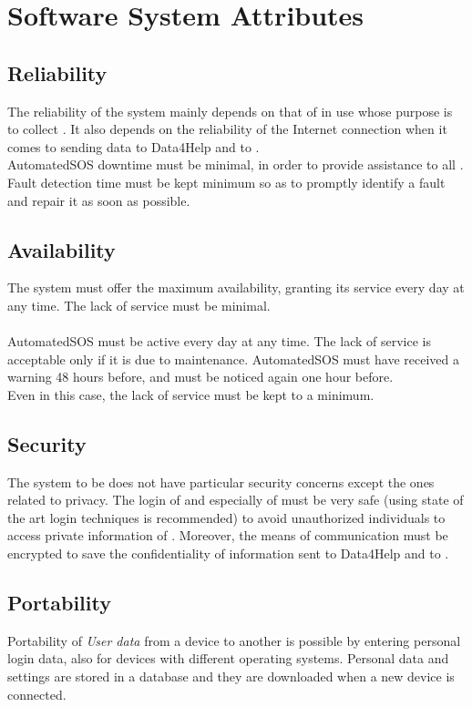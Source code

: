 \documentclass[../../rasd.tex]{subfiles}
\begin{document}
\section{Software System Attributes}
			
			\subsection{Reliability\label{sect:3.5.1}}
			The reliability of the system mainly depends on that of  in use whose purpose is to collect . It also depends on the reliability of the Internet connection when it comes to sending data to Data4Help and to .\\
			AutomatedSOS downtime must be minimal, in order to provide assistance to all . Fault detection time must be kept minimum so as to promptly identify a fault and repair it as soon as possible.

			\subsection{Availability}
			The system must offer the maximum availability, granting its service every day at any time. The lack of service must be minimal.\\\\
			AutomatedSOS must be active every day at any time. The lack of service is acceptable only if it is due to maintenance. AutomatedSOS  must have received a warning 48 hours before, and must be noticed again one hour before. \\
			Even in this case, the lack of service must be kept to a minimum.

			\subsection{Security}
			The system to be does not have particular security concerns except the ones related to privacy. The login of  and especially of  must be very safe (using state of the art login techniques is recommended) to avoid unauthorized individuals to access private information of . Moreover, the means of communication must be encrypted to save the confidentiality of information sent to Data4Help and to .
			
			\subsection{Portability}
			Portability of \textit{User data} from a device to another is possible by entering personal login data, also for devices with different operating systems.
			Personal data and settings are stored in a database and they are downloaded when a new device is connected.
\end{document}
